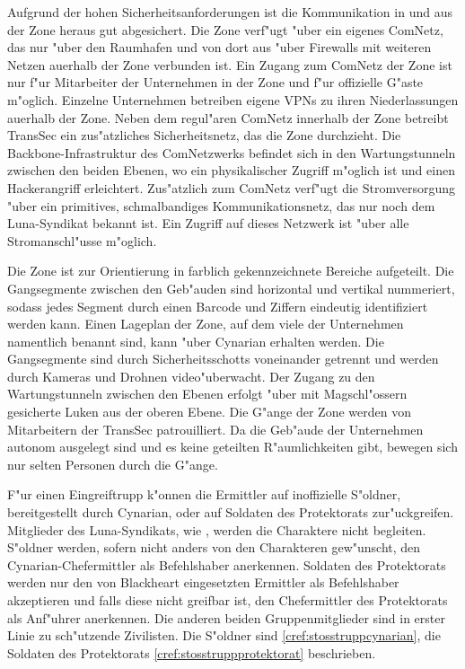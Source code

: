 Aufgrund der hohen Sicherheitsanforderungen ist die Kommunikation in und aus der Zone heraus gut abgesichert. Die Zone verf"ugt "uber ein eigenes ComNetz, das nur "uber den Raumhafen und von dort aus "uber Firewalls mit weiteren Netzen au\3erhalb der Zone verbunden ist. Ein Zugang zum ComNetz der Zone ist nur f"ur Mitarbeiter der Unternehmen in der Zone und f"ur offizielle G"aste m"oglich. Einzelne Unternehmen betreiben eigene VPNs zu ihren Niederlassungen au\3erhalb der Zone. Neben dem regul"aren ComNetz innerhalb der Zone betreibt TransSec ein zus"atzliches Sicherheitsnetz, das die Zone durchzieht. Die Backbone-Infrastruktur des ComNetzwerks befindet sich in den Wartungstunneln zwischen den beiden Ebenen, wo ein physikalischer Zugriff m"oglich ist und einen Hackerangriff erleichtert. Zus"atzlich zum ComNetz verf"ugt die Stromversorgung "uber ein primitives, schmalbandiges Kommunikationsnetz, das nur noch dem Luna-Syndikat bekannt ist. Ein Zugriff auf dieses Netzwerk ist "uber alle Stromanschl"usse m"oglich.

Die Zone ist zur Orientierung in farblich gekennzeichnete Bereiche aufgeteilt. Die Gangsegmente zwischen den Geb"auden sind horizontal und vertikal nummeriert, sodass jedes Segment durch einen Barcode und Ziffern eindeutig identifiziert werden kann. Einen Lageplan der Zone, auf dem viele der Unternehmen namentlich benannt sind, kann "uber Cynarian erhalten werden. Die Gangsegmente sind durch Sicherheitsschotts voneinander getrennt und werden durch Kameras und Drohnen video"uberwacht. Der Zugang zu den Wartungstunneln zwischen den Ebenen erfolgt "uber mit Magschl"ossern gesicherte Luken aus der oberen Ebene. Die G"ange der Zone werden von Mitarbeitern der TransSec patrouilliert. Da die Geb"aude der Unternehmen autonom ausgelegt sind und es keine geteilten R"aumlichkeiten gibt, bewegen sich nur selten Personen durch die G"ange.

F"ur einen Eingreiftrupp k"onnen die Ermittler auf inoffizielle S"oldner, bereitgestellt durch Cynarian, oder auf Soldaten des Protektorats zur"uckgreifen. Mitglieder des Luna-Syndikats, wie \xl{}, werden die Charaktere nicht begleiten. S"oldner werden, sofern nicht anders von den Charakteren gew"unscht, den Cynarian-Chefermittler als Befehlshaber anerkennen. Soldaten des Protektorats werden nur den von Blackheart eingesetzten Ermittler als Befehlshaber akzeptieren und falls diese nicht greifbar ist, den Chefermittler des Protektorats als Anf"uhrer anerkennen. Die anderen beiden Gruppenmitglieder sind in erster Linie zu sch"utzende Zivilisten. Die S"oldner sind  \cref{cref:stosstruppcynarian}, die Soldaten des Protektorats \cref{cref:stosstruppprotektorat} beschrieben.

